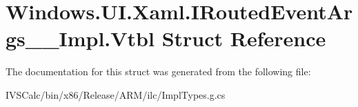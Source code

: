 \hypertarget{struct_windows_1_1_u_i_1_1_xaml_1_1_i_routed_event_args_____impl_1_1_vtbl}{}\section{Windows.\+U\+I.\+Xaml.\+I\+Routed\+Event\+Args\+\_\+\+\_\+\+Impl.\+Vtbl Struct Reference}
\label{struct_windows_1_1_u_i_1_1_xaml_1_1_i_routed_event_args_____impl_1_1_vtbl}


The documentation for this struct was generated from the following file\+:\begin{DoxyCompactItemize}
\item 
I\+V\+S\+Calc/bin/x86/\+Release/\+A\+R\+M/ilc/Impl\+Types.\+g.\+cs\end{DoxyCompactItemize}
